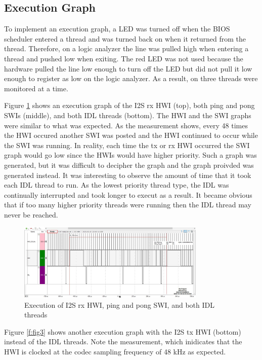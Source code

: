 \documentclass[11pt,pdftex,portrait,letterpaper]{article}
\begin{document}
\subsection{Execution Graph}

To implement an execution graph, a LED was turned off when the BIOS scheduler entered a thread and was turned back on when it returned from the thread. Therefore, on a logic analyzer the line was pulled high when entering a thread and pushed low when exiting. The red LED was not used because the hardware pulled the line low enough to turn off the LED but did not pull it low enough to register as low on the logic analyzer. As a result, on three threads were monitored at a time. 

Figure \ref{f:fig2} shows an execution graph of the I2S rx HWI (top), both ping and pong SWIs (middle), and both IDL threads (bottom). The HWI and the SWI graphs were similar to what was expected. As the measurement shows, every 48 times the HWI occured another SWI was posted and the HWI continued to occur while the SWI was running. In reality, each time the tx or rx HWI occurred the SWI graph would go low since the HWIs would have higher priority. Such a graph was generated, but it was difficult to decipher the graph and the graph proivded was generated instead. It was interesting to observe the amount of time that it took each IDL thread to run. As the lowest priority thread type, the IDL was continually interrupted and took longer to execut as a result. It became obvious that if too many higher priority threads were running then the IDL thread may never be reached.

\begin{figure}[h]
\centering
\includegraphics[width=0.8\textwidth]{./execution1}
\caption{Execution of I2S rx HWI, ping and pong SWI, and both IDL threads}
\label{f:fig2}
\end{figure}

Figure \ref{f:fig3} shows another execution graph with the I2S tx HWI (bottom) instead of the IDL threads. Note the measurement, which inidicates that the HWI is clocked at the codec sampling frequency of 48 kHz as expected. 
\end{document}
